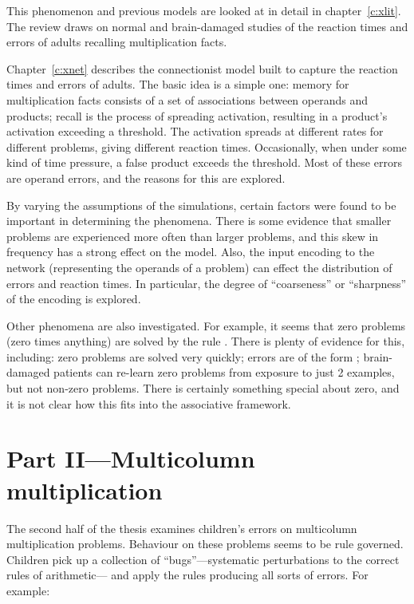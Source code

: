 This phenomenon and previous models are looked at in detail in
chapter~\ref{c:xlit}. The review draws on normal and brain-damaged studies
of the reaction times and errors of adults recalling multiplication facts.

Chapter~\ref{c:xnet} describes the connectionist model built to capture
the reaction times and errors of adults.  The basic idea is a simple one:
memory for multiplication facts consists of a set of associations between
operands and products; recall is the process of spreading activation,
resulting in a product's activation
exceeding a threshold.  The activation spreads at
different rates for different problems, giving different reaction times.
Occasionally, when under some kind of time pressure, a false product
exceeds the threshold.  Most of these errors are operand errors, and the
reasons for this are explored.

By varying the assumptions of the simulations,
certain factors were found
to be important in determining the phenomena.   There is
some evidence that
smaller problems are experienced more often than larger problems, and this
skew in frequency has a strong effect on the model.  Also, the input
encoding to the network (representing the operands of a problem) can effect
the distribution of errors and reaction times. In particular,
the degree of ``coarseness'' or ``sharpness'' of the encoding is explored.

Other phenomena are also investigated.  For example, it seems that zero
problems (zero times anything) are solved by the rule .  There
is plenty of evidence for this, including: zero problems are solved very
quickly; errors are of the form ; brain-damaged patients can
re-learn zero problems from exposure to just 2 examples, but not
non-zero problems.  There is certainly something special about zero, and it
is not clear how this fits into the
associative framework.


\section{Part II---Multicolumn multiplication}

The second half of the thesis examines children's errors on
multicolumn multiplication problems.  Behaviour on these problems seems to
be rule governed. Children pick up a collection of
``bugs''---systematic perturbations to the correct rules of arithmetic---
and apply the rules producing all sorts of errors. For example:

